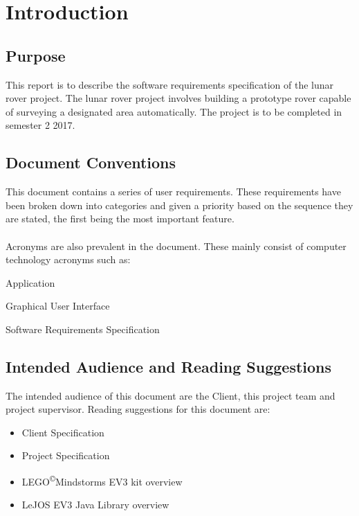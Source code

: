 \documentclass[10pt,a4paper,titlepage]{article}
\newcommand{\cpright}{\textsuperscript{\tiny\copyright}}
\begin{document}
	\newpage
	
	\section{Introduction}
	\subsection{Purpose}
	This report is to describe the software requirements specification of the lunar rover project. The lunar rover project involves building a prototype rover capable of surveying a designated area automatically. The project is to be completed in semester 2 2017.
	
	\subsection{Document Conventions}
	This document contains a series of user requirements. These requirements have been broken down into categories and given a priority based on the sequence they are stated, the first being the most important feature.
	\paragraph{}
	Acronyms are also prevalent in the document. These mainly consist of computer technology acronyms such as:
	\begin{description}[align=right,labelwidth=3cm]
		\item [App] Application
		\item [GUI] Graphical User Interface
		\item [SRS] Software Requirements Specification 
		\item [....]
	\end{description}
	
	\subsection{Intended Audience and Reading Suggestions}
	The intended audience of this document are the Client, this project team and project supervisor. Reading suggestions for this document are:
	\begin{itemize}
		\item Client Specification
		\item Project Specification
		\item LEGO\cpright Mindstorms EV3 kit overview
		\item LeJOS EV3 Java Library overview
	\end{itemize}
	
\end{document}
